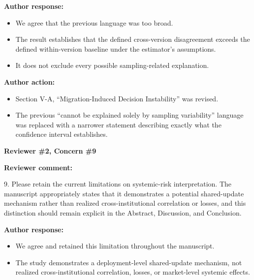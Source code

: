 \documentclass[11pt]{article}
\newcommand{\rvcomment}[1]{{\color{ReviewerGreen}#1}}
\newcommand{\concern}[1]{\textbf{\color{ReviewerGreen}#1}}
\begin{document}
\textbf{Author response:}

\begin{itemize}

\item We agree that the previous language was too broad.

\item The result establishes that the defined cross-version disagreement exceeds the defined within-version baseline under the estimator's assumptions.

\item It does not exclude every possible sampling-related explanation.

\end{itemize}

\textbf{Author action:}

\begin{itemize}

\item Section V-A, ``Migration-Induced Decision Instability'' was revised.

\item The previous ``cannot be explained solely by sampling variability'' language was replaced with a narrower statement describing exactly what the confidence interval establishes.

\end{itemize}

\vspace{12pt}
\concern{Reviewer \#2, Concern \#9}

\concern{Reviewer comment:}

\rvcomment{9. Please retain the current limitations on systemic-risk interpretation. The manuscript appropriately states that it demonstrates a potential shared-update mechanism rather than realized cross-institutional correlation or losses, and this distinction should remain explicit in the Abstract, Discussion, and Conclusion.}

\textbf{Author response:}

\begin{itemize}

\item We agree and retained this limitation throughout the manuscript.

\item The study demonstrates a deployment-level shared-update mechanism, not realized cross-institutional correlation, losses, or market-level systemic effects.

\end{itemize}
\end{document}
